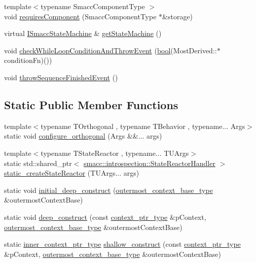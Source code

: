 \begin{DoxyCompactItemize}
\item 
{\footnotesize template$<$typename Smacc\+Component\+Type $>$ }\\void \hyperlink{classsmacc_1_1SmaccState_a2febb778d5c3d80b9c034576b5a92b65}{requires\+Component} (Smacc\+Component\+Type $\ast$\&storage)
\item 
virtual \hyperlink{classsmacc_1_1ISmaccStateMachine}{I\+Smacc\+State\+Machine} \& \hyperlink{classsmacc_1_1SmaccState_afc39f8e0ca4001b2159a100da2fccd0e}{get\+State\+Machine} ()
\item 
void \hyperlink{classsmacc_1_1SmaccState_a80082718f226bebedb589f0c4696001d}{check\+While\+Loop\+Condition\+And\+Throw\+Event} (\hyperlink{classbool}{bool}(Most\+Derived\+::$\ast$condition\+Fn)())
\item 
void \hyperlink{classsmacc_1_1SmaccState_a49dcfc25824f7e083dd4b999c49ab2b6}{throw\+Sequence\+Finished\+Event} ()
\end{DoxyCompactItemize}
\subsection*{Static Public Member Functions}
\begin{DoxyCompactItemize}
\item 
{\footnotesize template$<$typename T\+Orthogonal , typename T\+Behavior , typename... Args$>$ }\\static void \hyperlink{classsmacc_1_1SmaccState_a9a9238f3f8dc18825771f64aefbc803a}{configure\+\_\+orthogonal} (Args \&\&... args)
\item 
{\footnotesize template$<$typename T\+State\+Reactor , typename... T\+U\+Args$>$ }\\static std\+::shared\+\_\+ptr$<$ \hyperlink{classsmacc_1_1introspection_1_1StateReactorHandler}{smacc\+::introspection\+::\+State\+Reactor\+Handler} $>$ \hyperlink{classsmacc_1_1SmaccState_a21ccc458f911ecc1e9a52287f7793ef8}{static\+\_\+create\+State\+Reactor} (T\+U\+Args... args)
\item 
static void \hyperlink{classsmacc_1_1SmaccState_af4b4635d16a32bdd3956e5d40ddbd01d}{initial\+\_\+deep\+\_\+construct} (\hyperlink{classsmacc_1_1SmaccState_aaf76bbe2aa9dd73e3284605f84ab4b16}{outermost\+\_\+context\+\_\+base\+\_\+type} \&outermost\+Context\+Base)
\item 
static void \hyperlink{classsmacc_1_1SmaccState_aac23d8a6909f75c5e5fca2a7c09b5368}{deep\+\_\+construct} (const \hyperlink{classsmacc_1_1SmaccState_a0e15b77514301039f6bc093a9d3f6425}{context\+\_\+ptr\+\_\+type} \&p\+Context, \hyperlink{classsmacc_1_1SmaccState_aaf76bbe2aa9dd73e3284605f84ab4b16}{outermost\+\_\+context\+\_\+base\+\_\+type} \&outermost\+Context\+Base)
\item 
static \hyperlink{classsmacc_1_1SmaccState_a65a772c2e2039e9a59148ba6ffb54d8a}{inner\+\_\+context\+\_\+ptr\+\_\+type} \hyperlink{classsmacc_1_1SmaccState_a1dccb401e1a99031863a21a590d953e6}{shallow\+\_\+construct} (const \hyperlink{classsmacc_1_1SmaccState_a0e15b77514301039f6bc093a9d3f6425}{context\+\_\+ptr\+\_\+type} \&p\+Context, \hyperlink{classsmacc_1_1SmaccState_aaf76bbe2aa9dd73e3284605f84ab4b16}{outermost\+\_\+context\+\_\+base\+\_\+type} \&outermost\+Context\+Base)
\end{DoxyCompactItemize}
